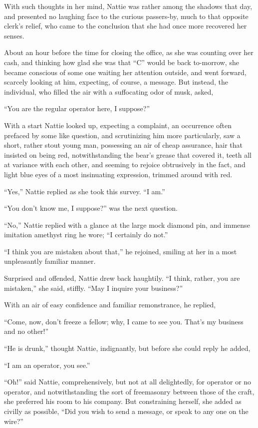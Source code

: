 With such thoughts in her mind, Nattie was rather among the shadows that
day, and presented no laughing face to the curious passers-by, much to
that opposite clerk's relief, who came to the conclusion that she had
once more recovered her senses.

About an hour before the time for closing the office, as she was
counting over her cash, and thinking how glad she was that ``C'' would be
back to-morrow, she became conscious of some one waiting her attention
outside, and went forward, scarcely looking at him, expecting, of
course, a message. But instead, the individual, who filled the air with
a suffocating odor of musk, asked,

``You are the regular operator here, I suppose?''

With a start Nattie looked up, expecting a complaint, an occurrence
often prefaced by some like question, and scrutinizing him more
particularly, saw a short, rather stout young man, possessing an air of
cheap assurance, hair that insisted on being red, notwithstanding the
bear's grease that covered it, teeth all at variance with each other,
and seeming to rejoice obtrusively in the fact, and light blue eyes of a
most insinuating expression, trimmed around with red.

``Yes,'' Nattie replied as she took this survey. ``I am.''

``You don't know me, I suppose?'' was the next question.

``No,'' Nattie replied with a glance at the large mock diamond pin, and
immense imitation amethyst ring he wore; ``I certainly do not.''

``I think you are mistaken about that,'' he rejoined, smiling at her in a
most unpleasantly familiar manner.

Surprised and offended, Nattie drew back haughtily. ``I think, rather,
you are mistaken,'' she said, stiffly. ``May I inquire your business?''

With an air of easy confidence and familiar remonstrance, he replied,

``Come, now, don't freeze a fellow; why, I came to see you. That's my
business and no other!''

``He is drunk,'' thought Nattie, indignantly, but before she could reply
he added,

``I am an operator, you see.''

``Oh!'' said Nattie, comprehensively, but not at all delightedly, for
operator or no operator, and notwithstanding the sort of freemasonry
between those of the craft, she preferred his room to his company. But
constraining herself, she added as civilly as possible, ``Did you wish to
send a message, or speak to any one on the wire?''

